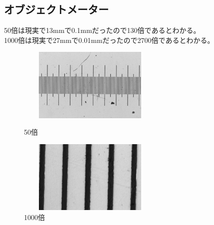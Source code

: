 \documentclass{jsarticle}
\begin{document}
\subsection{オブジェクトメーター}
50倍は現実で13mmで0.1mmだったので130倍であるとわかる。\\
1000倍は現実で27mmで0.01mmだったので2700倍であるとわかる。
\begin{figure}[htbp]
 \begin{minipage}{0.5\hsize}
  \begin{center}
   \includegraphics[width=70mm,height=35mm]{pictures/obj_x50.bmp}
  \end{center}
  \caption{50倍}
  \label{fig:one}
 \end{minipage}
 \begin{minipage}{0.5\hsize}
  \begin{center}
   \includegraphics[width=70mm,height=35mm]{pictures/obj_x1000.bmp}
  \end{center}
  \caption{1000倍}
  \label{fig:two}
 \end{minipage}
\end{figure}
\end{document}
